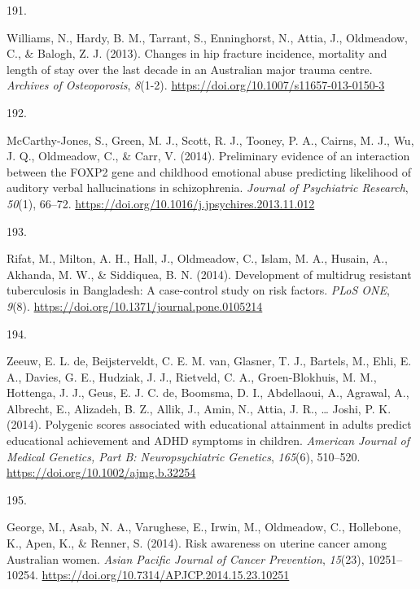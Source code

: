 \documentclass[11pt, a4paper]{awesome-cv}
\newlength{\csllabelwidth}
\newcommand{\CSLLeftMargin}[1]{\parbox[t]{\csllabelwidth}{#1}}
\newcommand{\CSLRightInline}[1]{\parbox[t]{\linewidth - \csllabelwidth}{#1}}
\begin{document}
\leavevmode\hypertarget{ref-williams_changes_2013}{}%
\CSLLeftMargin{191. }
\CSLRightInline{Williams, N., Hardy, B. M., Tarrant, S., Enninghorst,
N., Attia, J., Oldmeadow, C., \& Balogh, Z. J. (2013). Changes in hip
fracture incidence, mortality and length of stay over the last decade in
an Australian major trauma centre. \emph{Archives of Osteoporosis},
\emph{8}(1-2). \url{https://doi.org/10.1007/s11657-013-0150-3}}

\leavevmode\hypertarget{ref-mccarthy-jones_preliminary_2014}{}%
\CSLLeftMargin{192. }
\CSLRightInline{McCarthy-Jones, S., Green, M. J., Scott, R. J., Tooney,
P. A., Cairns, M. J., Wu, J. Q., Oldmeadow, C., \& Carr, V. (2014).
Preliminary evidence of an interaction between the FOXP2 gene and
childhood emotional abuse predicting likelihood of auditory verbal
hallucinations in schizophrenia. \emph{Journal of Psychiatric Research},
\emph{50}(1), 66--72.
\url{https://doi.org/10.1016/j.jpsychires.2013.11.012}}

\leavevmode\hypertarget{ref-rifat_development_2014}{}%
\CSLLeftMargin{193. }
\CSLRightInline{Rifat, M., Milton, A. H., Hall, J., Oldmeadow, C.,
Islam, M. A., Husain, A., Akhanda, M. W., \& Siddiquea, B. N. (2014).
Development of multidrug resistant tuberculosis in Bangladesh: A
case-control study on risk factors. \emph{PLoS ONE}, \emph{9}(8).
\url{https://doi.org/10.1371/journal.pone.0105214}}

\leavevmode\hypertarget{ref-de_zeeuw_polygenic_2014}{}%
\CSLLeftMargin{194. }
\CSLRightInline{Zeeuw, E. L. de, Beijsterveldt, C. E. M. van, Glasner,
T. J., Bartels, M., Ehli, E. A., Davies, G. E., Hudziak, J. J.,
Rietveld, C. A., Groen-Blokhuis, M. M., Hottenga, J. J., Geus, E. J. C.
de, Boomsma, D. I., Abdellaoui, A., Agrawal, A., Albrecht, E., Alizadeh,
B. Z., Allik, J., Amin, N., Attia, J. R., \ldots{} Joshi, P. K. (2014).
Polygenic scores associated with educational attainment in adults
predict educational achievement and ADHD symptoms in children.
\emph{American Journal of Medical Genetics, Part B: Neuropsychiatric
Genetics}, \emph{165}(6), 510--520.
\url{https://doi.org/10.1002/ajmg.b.32254}}

\leavevmode\hypertarget{ref-george_risk_2014}{}%
\CSLLeftMargin{195. }
\CSLRightInline{George, M., Asab, N. A., Varughese, E., Irwin, M.,
Oldmeadow, C., Hollebone, K., Apen, K., \& Renner, S. (2014). Risk
awareness on uterine cancer among Australian women. \emph{Asian Pacific
Journal of Cancer Prevention}, \emph{15}(23), 10251--10254.
\url{https://doi.org/10.7314/APJCP.2014.15.23.10251}}
\end{document}
